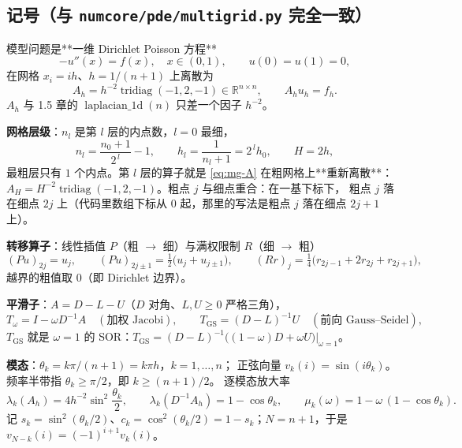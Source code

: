 \subsection*{记号（与 \texttt{numcore/pde/multigrid.py} 完全一致）}

模型问题是**一维 Dirichlet Poisson 方程**
\begin{equation}
  -u''(x)=f(x),\quad x\in(0,1),\qquad u(0)=u(1)=0,
  \label{eq:mg-model}
\end{equation}
在网格 $x_i=ih$、$h=1/(n+1)$ 上离散为
\begin{equation}
  A_h=h^{-2}\operatorname{tridiag}(-1,2,-1)\in\mathbb R^{n\times n},
  \qquad A_hu_h=f_h .
  \label{eq:mg-A}
\end{equation}
$A_h$ 与 1.5 章的 $\operatorname{laplacian\_1d}(n)$ 只差一个因子 $h^{-2}$。

\textbf{网格层级}：$n_l$ 是第 $l$ 层的内点数，$l=0$ 最细，
\begin{equation}
  n_l=\frac{n_0+1}{2^{\,l}}-1,\qquad
  h_l=\frac{1}{n_l+1}=2^{\,l}h_0,\qquad H=2h ,
  \label{eq:mg-hierarchy}
\end{equation}
最粗层只有 $1$ 个内点。第 $l$ 层的算子就是 \eqref{eq:mg-A} 在粗网格上**重新离散**：
$A_H=H^{-2}\operatorname{tridiag}(-1,2,-1)$。粗点 $j$ 与细点重合：在一基下标下，
粗点 $j$ 落在细点 $2j$ 上（代码里数组下标从 $0$ 起，那里的写法是粗点 $j$ 落在细点 $2j+1$ 上）。

\textbf{转移算子}：线性插值 $P$（粗 $\to$ 细）与满权限制 $R$（细 $\to$ 粗）
\begin{equation}
  (Pu)_{2j}=u_j,\qquad (Pu)_{2j\pm1}=\tfrac12\bigl(u_j+u_{j\pm1}\bigr),
  \qquad
  (Rr)_j=\tfrac14\bigl(r_{2j-1}+2r_{2j}+r_{2j+1}\bigr),
  \label{eq:mg-PR}
\end{equation}
越界的粗值取 $0$（即 Dirichlet 边界）。

\textbf{平滑子}：$A=D-L-U$（$D$ 对角、$L,U\ge0$ 严格三角），
\begin{equation}
  T_\omega=I-\omega D^{-1}A\quad(\text{加权 Jacobi}),\qquad
  T_{\mathrm{GS}}=(D-L)^{-1}U\quad(\text{前向 Gauss--Seidel}),
  \label{eq:mg-smoothers}
\end{equation}
$T_{\mathrm{GS}}$ 就是 $\omega=1$ 的 SOR：$T_{\mathrm{GS}}=(D-L)^{-1}\bigl((1-\omega)D+\omega U\bigr)\big|_{\omega=1}$。

\textbf{模态}：$\theta_k=k\pi/(n+1)=k\pi h$，$k=1,\dots,n$；
正弦向量 $v_k(i)=\sin(i\theta_k)$。频率半带指 $\theta_k\ge\pi/2$，即 $k\ge(n+1)/2$。
逐模态放大率
\begin{equation}
  \lambda_k(A_h)=4h^{-2}\sin^2\frac{\theta_k}{2},\qquad
  \lambda_k(D^{-1}A_h)=1-\cos\theta_k,\qquad
  \mu_k(\omega)=1-\omega\,(1-\cos\theta_k).
  \label{eq:mg-modes}
\end{equation}
记 $s_k=\sin^2(\theta_k/2)$、$c_k=\cos^2(\theta_k/2)=1-s_k$；$N=n+1$，于是 $v_{N-k}(i)=(-1)^{i+1}v_k(i)$。

